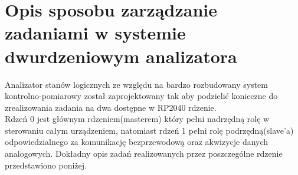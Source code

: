 \section{Opis sposobu zarządzanie zadaniami w systemie dwurdzeniowym analizatora}

Analizator stanów logicznych ze względu na bardzo rozbudowany system kontrolno-pomiarowy
został zaprojektowany tak aby podzielić konieczne do zrealizowania zadania na dwa dostępne w 
RP2040 rdzenie. \\
Rdzeń 0 jest głównym rdzeniem(masterem) który pełni nadrzędną rolę w sterowaniu całym urządzeniem,
natomiast rdzeń 1 pełni rolę podrzędną(slave'a) odpowiedzialnego za komunikację bezprzewodową oraz akwizycje danych analogowych.
Dokładny opis zadań realizowanych przez poszczególne rdzenie przedstawiono poniżej.

